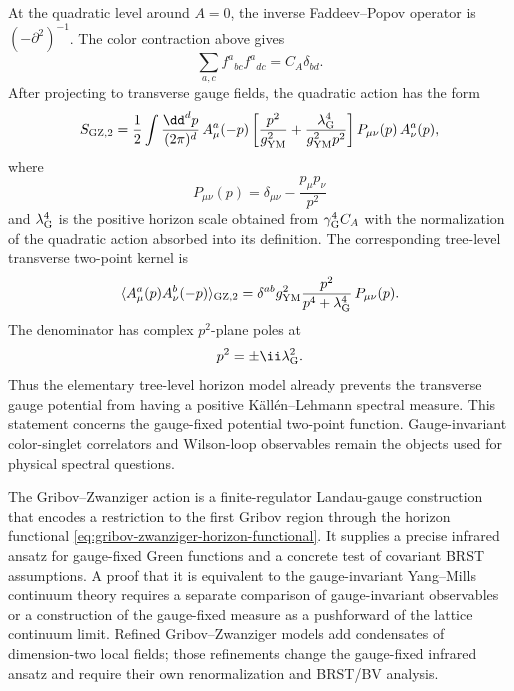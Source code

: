 At the quadratic level around \(A=0\), the inverse Faddeev--Popov operator is
\((-\partial^2)^{-1}\).  The color contraction above gives
\[
  \sum_{a,c} f^a{}_{bc}f^a{}_{dc}=C_A\delta_{bd}.
\]
After projecting to transverse gauge fields, the quadratic action has the
form
\begin{equation}
  S_{{\rm GZ},2}
  =
  \frac12
  \int\frac{\dd^d p}{(2\pi)^d}\,
  A_\mu^a(-p)
  \left[
    \frac{p^2}{g_{\rm YM}^2}
    +\frac{\lambda_{\rm G}^4}{g_{\rm YM}^2p^2}
  \right]
  P_{\mu\nu}(p)\,
  A_\nu^a(p),
  \label{eq:gz-quadratic-kernel}
\end{equation}
where
\[
  P_{\mu\nu}(p)=\delta_{\mu\nu}-\frac{p_\mu p_\nu}{p^2}
\]
and \(\lambda_{\rm G}^4\) is the positive horizon scale obtained from
\(\gamma_{\rm G}^4 C_A\) with the normalization of the quadratic action
absorbed into its definition.  The corresponding tree-level transverse
two-point kernel is
\begin{equation}
  \langle A_\mu^a(p)A_\nu^b(-p)\rangle_{{\rm GZ},2}
  =
  \delta^{ab}g_{\rm YM}^2
  \frac{p^2}{p^4+\lambda_{\rm G}^4}\,
  P_{\mu\nu}(p).
  \label{eq:gz-tree-transverse-propagator}
\end{equation}
The denominator has complex \(p^2\)-plane poles at
\[
  p^2=\pm \ii\lambda_{\rm G}^2 .
\]
Thus the elementary tree-level horizon model already prevents the transverse
gauge potential from having a positive Källén--Lehmann spectral measure.
This statement concerns the gauge-fixed potential two-point function.
Gauge-invariant color-singlet correlators and Wilson-loop observables remain
the objects used for physical spectral questions.

\begin{remark}
\label{ca:gribov-zwanziger-status}
The Gribov--Zwanziger action is a finite-regulator Landau-gauge construction
that encodes a restriction to the first Gribov region through the horizon
functional \eqref{eq:gribov-zwanziger-horizon-functional}.  It supplies a
precise infrared ansatz for gauge-fixed Green functions and a concrete test of
covariant BRST assumptions.  A proof that it is equivalent to the
gauge-invariant Yang--Mills continuum theory requires a separate comparison
of gauge-invariant observables or a construction of the gauge-fixed measure as
a pushforward of the lattice continuum limit.  Refined Gribov--Zwanziger
models add condensates of dimension-two local fields; those refinements change
the gauge-fixed infrared ansatz and require their own renormalization and
BRST/BV analysis.
\end{remark}

